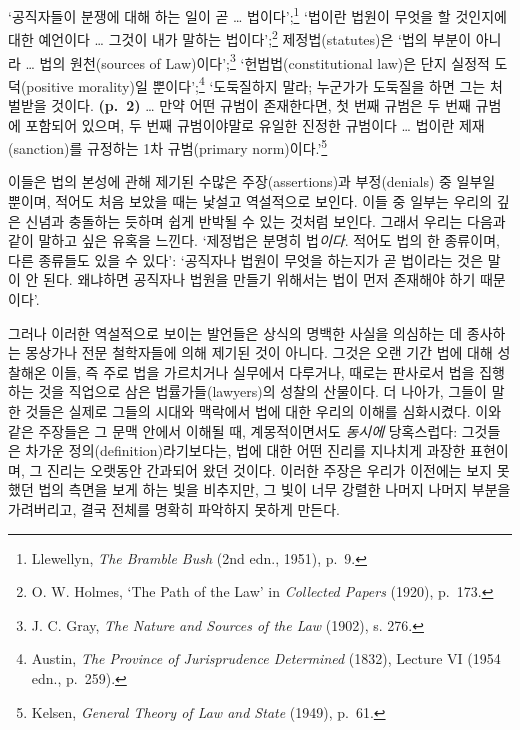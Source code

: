 \documentclass[12pt, oneside]{book}  %
\begin{document}
`공직자들이 분쟁에 대해 하는 일이 곧 \ldots{} 법이다';\footnote{Llewellyn,
  \emph{The Bramble Bush} (2nd edn., 1951), p.~9.} `법이란 법원이 무엇을
할 것인지에 대한 예언이다 \ldots{} 그것이 내가 말하는
법이다';\footnote{O. W. Holmes, `The Path of the Law' in \emph{Collected
  Papers} (1920), p.~173.} 제정법(statutes)은 `법의 부분이 아니라
\ldots{} 법의 원천(sources of Law)이다';\footnote{J. C. Gray, \emph{The
  Nature and Sources of the Law} (1902), s. 276.} `헌법법(constitutional
law)은 단지 실정적 도덕(positive morality)일 뿐이다';\footnote{Austin,
  \emph{The Province of Jurisprudence Determined} (1832), Lecture VI
  (1954 edn., p.~259).} `도둑질하지 말라; 누군가가 도둑질을 하면 그는
처벌받을 것이다. \textbf{(p.~2)} \ldots{} 만약 어떤 규범이 존재한다면,
첫 번째 규범은 두 번째 규범에 포함되어 있으며, 두 번째 규범이야말로
유일한 진정한 규범이다 \ldots{} 법이란 제재(sanction)를 규정하는 1차
규범(primary norm)이다.'\footnote{Kelsen, \emph{General Theory of Law
  and State} (1949), p.~61.}

이들은 법의 본성에 관해 제기된 수많은 주장(assertions)과 부정(denials)
중 일부일 뿐이며, 적어도 처음 보았을 때는 낯설고 역설적으로 보인다. 이들
중 일부는 우리의 깊은 신념과 충돌하는 듯하며 쉽게 반박될 수 있는 것처럼
보인다. 그래서 우리는 다음과 같이 말하고 싶은 유혹을 느낀다. `제정법은
분명히 법\emph{이다}. 적어도 법의 한 종류이며, 다른 종류들도 있을 수
있다': `공직자나 법원이 무엇을 하는지가 곧 법이라는 것은 말이 안 된다.
왜냐하면 공직자나 법원을 만들기 위해서는 법이 먼저 존재해야 하기
때문이다'.

그러나 이러한 역설적으로 보이는 발언들은 상식의 명백한 사실을 의심하는
데 종사하는 몽상가나 전문 철학자들에 의해 제기된 것이 아니다. 그것은
오랜 기간 법에 대해 성찰해온 이들, 즉 주로 법을 가르치거나 실무에서
다루거나, 때로는 판사로서 법을 집행하는 것을 직업으로 삼은
법률가들(lawyers)의 성찰의 산물이다. 더 나아가, 그들이 말한 것들은
실제로 그들의 시대와 맥락에서 법에 대한 우리의 이해를 심화시켰다. 이와
같은 주장들은 그 문맥 안에서 이해될 때, 계몽적이면서도 \emph{동시에}
당혹스럽다: 그것들은 차가운 정의(definition)라기보다는, 법에 대한 어떤
진리를 지나치게 과장한 표현이며, 그 진리는 오랫동안 간과되어 왔던
것이다. 이러한 주장은 우리가 이전에는 보지 못했던 법의 측면을 보게 하는
빛을 비추지만, 그 빛이 너무 강렬한 나머지 나머지 부분을 가려버리고, 결국
전체를 명확히 파악하지 못하게 만든다.
\end{document}
